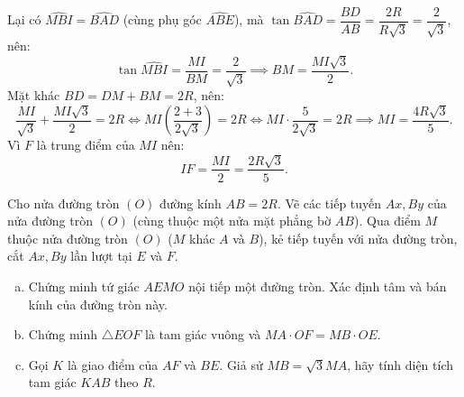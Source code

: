 \begin{bt}
{\begin{enumerate}[a)]
    Lại có $\widehat{MBI} = \widehat{BAD}$ (cùng phụ góc $\widehat{ABE}$), mà $\tan \widehat{BAD} = \dfrac{BD}{AB} = \dfrac{2R}{R\sqrt{3}} = \dfrac{2}{\sqrt{3}}$, nên:
    $$\tan \widehat{MBI} = \dfrac{MI}{BM} = \dfrac{2}{\sqrt{3}} \implies BM = \dfrac{MI\sqrt{3}}{2}.$$
    Mặt khác $BD = DM + BM = 2R$, nên:
    $$\dfrac{MI}{\sqrt{3}} + \dfrac{MI\sqrt{3}}{2} = 2R \iff MI\left(\dfrac{2 + 3}{2\sqrt{3}}\right) = 2R \iff MI \cdot \dfrac{5}{2\sqrt{3}} = 2R \implies MI = \dfrac{4R\sqrt{3}}{5}.$$
    Vì $F$ là trung điểm của $MI$ nên:
    $$IF = \dfrac{MI}{2} = \dfrac{2R\sqrt{3}}{5}.$$
\end{enumerate}
}
\end{bt}


\begin{bt}%
Cho nửa đường tròn $(O)$ đường kính $AB = 2R$. Vẽ các tiếp tuyến $Ax, By$ của nửa đường tròn $(O)$ (cùng thuộc một nửa mặt phẳng bờ $AB$). Qua điểm $M$ thuộc nửa đường tròn $(O)$ ($M$ khác $A$ và $B$), kẻ tiếp tuyến với nửa đường tròn, cắt $Ax, By$ lần lượt tại $E$ và $F$.
\begin{enumerate}[a)]
    \item Chứng minh tứ giác $AEMO$ nội tiếp một đường tròn. Xác định tâm và bán kính của đường tròn này.
    \item Chứng minh $\triangle EOF$ là tam giác vuông và $MA \cdot OF = MB \cdot OE$.
    \item Gọi $K$ là giao điểm của $AF$ và $BE$. Giả sử $MB = \sqrt{3}MA$, hãy tính diện tích tam giác $KAB$ theo $R$.
\end{enumerate}
\end{bt}
